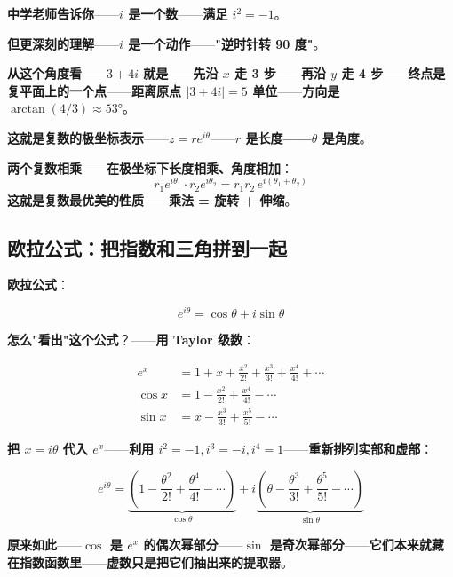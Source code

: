 \begin{tcolorbox}[ahabox={Aha: $i$ 是动词不是名词}]
\textbf{中学老师告诉你}——\textbf{$i$ 是一个数}——\textbf{满足 $i^2 = -1$}。

\medskip

\textbf{但更深刻的理解}——\textbf{$i$ 是一个\textbf{动作}}——\textbf{"逆时针转 90 度"}。

\medskip

\textbf{从这个角度看}——\textbf{$3 + 4i$ 就是}——\textbf{先沿 $x$ 走 3 步}——\textbf{再沿 $y$ 走 4 步}——\textbf{终点是复平面上的一个点}——\textbf{距离原点 $|3+4i| = 5$ 单位}——\textbf{方向是 $\arctan(4/3) \approx 53°$}。

\medskip

\textbf{这就是复数的\textbf{极坐标表示}}——\textbf{$z = r e^{i\theta}$}——\textbf{$r$ 是长度——$\theta$ 是角度}。

\medskip

\textbf{两个复数相乘}——\textbf{在极坐标下\textbf{长度相乘、角度相加}}：
\[
r_1 e^{i\theta_1} \cdot r_2 e^{i\theta_2} = r_1 r_2 \, e^{i(\theta_1 + \theta_2)}
\]
\textbf{这就是复数最优美的性质}——\textbf{乘法 = 旋转 + 伸缩}。
\end{tcolorbox}

\subsection{欧拉公式：把指数和三角拼到一起}

\textbf{欧拉公式}：

\[
\boxed{\;e^{i\theta} = \cos\theta + i\sin\theta\;}
\]

\textbf{怎么"看出"这个公式}？——\textbf{用 Taylor 级数}：

\begin{align*}
e^x &= 1 + x + \frac{x^2}{2!} + \frac{x^3}{3!} + \frac{x^4}{4!} + \cdots \\
\cos x &= 1 - \frac{x^2}{2!} + \frac{x^4}{4!} - \cdots \\
\sin x &= x - \frac{x^3}{3!} + \frac{x^5}{5!} - \cdots
\end{align*}

\textbf{把 $x = i\theta$ 代入 $e^x$}——\textbf{利用 $i^2 = -1, i^3 = -i, i^4 = 1$}——\textbf{重新排列实部和虚部}：

\[
e^{i\theta} = \underbrace{\left(1 - \frac{\theta^2}{2!} + \frac{\theta^4}{4!} - \cdots\right)}_{\cos\theta} + i\underbrace{\left(\theta - \frac{\theta^3}{3!} + \frac{\theta^5}{5!} - \cdots\right)}_{\sin\theta}
\]

\textbf{原来如此}——\textbf{$\cos$ 是 $e^x$ 的\textbf{偶次幂部分}}——\textbf{$\sin$ 是\textbf{奇次幂部分}}——\textbf{它们本来就藏在指数函数里}——\textbf{虚数只是\textbf{把它们抽出来的提取器}}。


